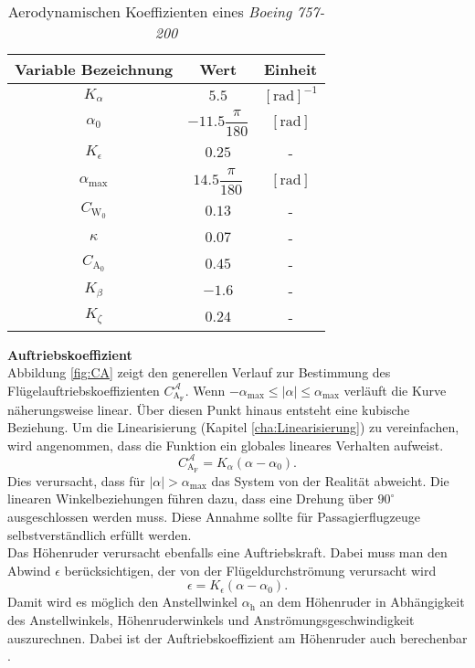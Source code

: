 \begin{table}[h]
\centering
 \begin{tabular}{||c c c  ||} 
 \hline
 Variable Bezeichnung & Wert & Einheit\\ 
 \hline\hline
 $K_\alpha$ & $5.5$ & $\mathrm{[rad]^{-1}}$ \\ 
 \hline
 $\alpha_0$ & $-11.5\dfrac{\pi}{180}$ & $\mathrm{[rad]}$ \\ 
 \hline
 $K_{\epsilon}$ & $0.25$ & - \\ 
 \hline
 $\alpha_\mathrm{max}$ & $14.5\dfrac{\pi}{180}$ & $\mathrm{[rad]}$ \\ 
 \hline
 $C_\mathrm{W_0}$ & $0.13$ & - \\ 
 \hline
 $\kappa$ & $0.07$ & -\\ 
 \hline
 $C_\mathrm{A_0}$ & $0.45$ & -\\ 
 \hline
 $K_\beta$ & $-1.6$ & -\\  
 \hline
 $K_\zeta$ & $0.24$ & -\\ 
 \hline
\end{tabular}
\caption{Aerodynamischen Koeffizienten eines \textit{Boeing 757-200}}
\label{tab:KonstBeiw}
\end{table}
\textbf{Auftriebskoeffizient}\\
Abbildung \ref{fig:CA} zeigt den generellen Verlauf zur Bestimmung des Flügelauftriebskoeffizienten $C_\mathrm{A_F}^\mathcal{A}$. Wenn $-\alpha_\mathrm{max}\leq|\alpha|\leq\alpha_\mathrm{max}$ verläuft die Kurve näherungsweise linear. Über diesen Punkt hinaus entsteht eine kubische Beziehung. Um die Linearisierung (Kapitel \ref{cha:Linearisierung}) zu vereinfachen, wird angenommen, dass die Funktion ein globales lineares Verhalten aufweist.
\begin{equation}
C_\mathrm{A_F}^\mathcal{A} = K_\alpha(\alpha - \alpha_0).
\end{equation} 
Dies verursacht, dass für $|\alpha|> \alpha_\mathrm{max}$ das System von der Realität abweicht. Die linearen Winkelbeziehungen führen dazu, dass eine Drehung über $90^{\circ}$  ausgeschlossen werden muss. Diese Annahme sollte für Passagierflugzeuge selbstverständlich erfüllt werden.\\
Das Höhenruder verursacht ebenfalls eine Auftriebskraft. Dabei muss man den Abwind $\epsilon$ berücksichtigen, der von der Flügeldurchströmung verursacht wird
\begin{equation}
\epsilon = K_{\epsilon}(\alpha-\alpha_\mathrm{0}).
\end{equation}
Damit wird es möglich den Anstellwinkel $\alpha_\mathrm{h}$ an dem Höhenruder in Abhängigkeit des Anstellwinkels, Höhenruderwinkels und Anströmungsgeschwindigkeit auszurechnen. Dabei ist der Auftriebskoeffizient am Höhenruder auch berechenbar \cite{RAMYoutube_Playlist}.
